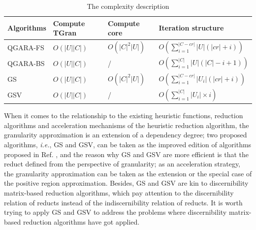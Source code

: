 \documentclass[review]{elsarticle}
\begin{document}
	\begin{table}[htbp]
		\caption{The complexity description}
		\label{complexity}
		\begin{tabular}{llll}
			\hline
			Algorithms   & Compute {\rm TGran}					 & Compute core                      & Iteration structure                                            \\ \hline
			QGARA-FS     & $O(|U||C|)$ 			             & $O(|C|^2|U|)$                     & $O(\sum_{i=1}^{|C-cr|}|U|(|cr|+i))$                       \\
			QGARA-BS     & $O(|U||C|)$ 			             & /                                 & $O(\sum_{i=1}^{|C|}|U|(|C|-i+1))$                              \\
			GS           & $O(|U||C|)$                       & $O(|C|^2|U|)$					 & $O(\sum_{i=1}^{|C-cr|}|U_i|(|cr|+i))$				 	  \\
			GSV			 & $O(|U||C|)$                       & /                                 & $O(\sum_{i=1}^{|C|}|U_i|\times i)$       				 	  \\ \hline
		\end{tabular}
	\end{table}
	\par When it comes to the relationship to the existing heuristic functions, reduction algorithms and acceleration mechanisms of the heuristic reduction algorithm, the granularity approximation is an extension of a dependency degree; two proposed algorithms, \emph{i.e.}, GS and GSV, can be taken as the improved edition of algorithms proposed in Ref. \cite{ge2017quick}, and the reason why GS and GSV are more efficient is that the reduct defined from the perspective of granularity; as an acceleration strategy, the granularity approximation can be taken as the extension or the special case of the positive region approximation. Besides, GS and GSV are kin to discernibility matrix-based reduction algorithms, which pay attention to the discernibility relation of reducts instead of the indiscernibility relation of reducts. It is worth trying to apply GS and GSV to address the problems where discernibility matrix-based reduction algorithms have got applied.
	
\end{document}
